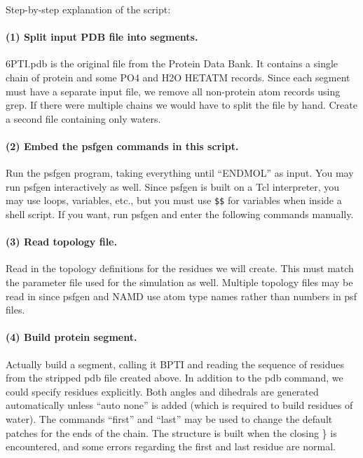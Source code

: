 Step-by-step explanation of the script:

\paragraph*{(1) Split input PDB file into segments.}

6PTI.pdb is the original file from the Protein Data Bank.  It contains
a single chain of protein and some PO4 and H2O HETATM records.  Since
each segment must have a separate input file, we remove all non-protein
atom records using grep.  If there were multiple chains we would have
to split the file by hand.  Create a second file containing only waters.

\paragraph*{(2) Embed the psfgen commands in this script.}
Run the psfgen program, taking everything until ``ENDMOL'' as input.
You may run psfgen interactively as well.  Since psfgen is built on
a Tcl interpreter, you may use loops, variables, etc., but you must
use \verb#$$# for variables when inside a shell script.  If you
want, run psfgen and enter the following commands manually.

\paragraph*{(3) Read topology file.}
Read in the topology definitions for the residues we will create.
This must match the parameter file used for the simulation as well.
Multiple topology files may be read in since psfgen and NAMD use atom
type names rather than numbers in psf files.

\paragraph*{(4) Build protein segment.}
Actually build a segment, calling it BPTI and reading the sequence
of residues from the stripped pdb file created above.  In addition to
the pdb command, we could specify residues explicitly.  Both angles
and dihedrals are generated automatically unless ``auto none'' is added
(which is required to build residues of water).  The commands ``first''
and ``last'' may be used to change the default patches for the ends of
the chain.  The structure is built when the closing \} is encountered,
and some errors regarding the first and last residue are normal.

